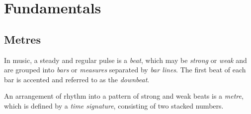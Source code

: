 


\usepackage{lyluatex}


\section{Fundamentals}

\subsection{Metres}

In music, a steady and regular pulse is a \emph{beat}, which may be \emph{strong} or \emph{weak} and are grouped into
\emph{bars} or \emph{measures} separated by \emph{bar lines}. The first beat of each bar is accented and referred to as
the \emph{downbeat}.

An arrangement of rhythm into a pattern of strong and weak beats is a \emph{metre}, which is defined by a \emph{time
signature}, consisting of two stacked numbers.


\Edc
